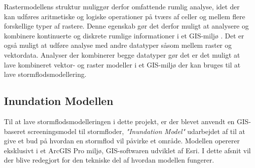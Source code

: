 Rastermodellens struktur muliggør derfor omfattende rumlig analyse, idet der kan udføres aritmetiske og logiske operationer på tværs af celler og mellem flere forskellige typer af rastere. Denne egenskab gør det derfor muligt at analysere og kombinere kontinuerte og diskrete rumlige informationer i et GIS-miljø \citep{bolstad_gis_2022, longley_geographical_2008}. Det er også muligt at udføre analyse med andre datatyper såsom mellem raster og vektordata. Analyser der kombinerer begge datatyper gør det er det muligt at lave kombineret vektor- og raster modeller i et GIS-miljø der kan bruges til at lave stormflodsmodellering.

\subsection{Inundation Modellen} \label{Afsnit: Inundation Model}

Til at lave stormflodsmodelleringen i dette projekt, er der blevet anvendt en GIS-baseret screeningsmodel til stormfloder,  \textit{"Inundation Model"} udarbejdet af \cite{balstrom_kirby_inundation} til at give et bud på hvordan en stormflod vil påvirke et område. Modellen opererer eksklusivt i et ArcGIS Pro miljø, GIS-softwaren udviklet af Esri. I dette afsnit vil der blive redegjort for den tekniske del af hvordan modellen fungerer.\\

